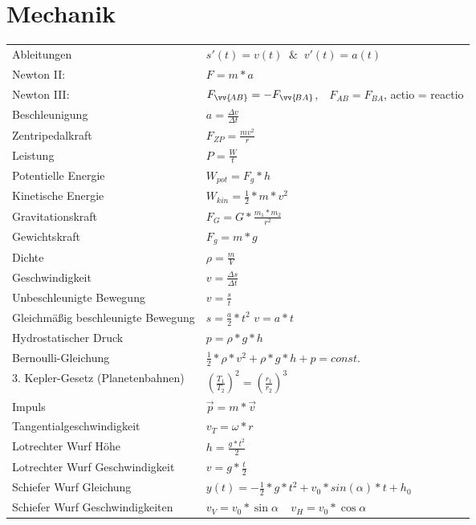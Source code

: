 \documentclass[12pt,a4paper]{paper}
\makeatletter
\newcommand{\mathleft}{\@fleqntrue\@mathmargin0pt}
\makeatother
\begin{document}
\section{Mechanik}
\mathleft
\begin{tabularx}{\textwidth}{X|X}
	Ableitungen & $s'(t) = v(t) \;\;\&\;\; v'(t) = a(t)$\\
	Newton II: & $F=m*a$\\
	Newton III: & ${F}_{\vv{\!AB}}=-{F}_{\vv{\!BA}}$,$\quad F_{AB} = F_{BA}$, actio = reactio \\
	Beschleunigung & $a=\frac{\Delta v}{\Delta t}$\\
	Zentripedalkraft & $F_{ZP}=\frac{mv^2}{r}$\\
	Leistung & $P = \frac{W}{t}$\\
	Potentielle Energie & $W_{pot} = F_g * h$\\
	Kinetische Energie & $W_{kin} = \frac{1}{2}*m*v^2$ \\
	Gravitationskraft & $F_G =G* \frac{m_1 * m_2 }{r^2}$\\
	Gewichtskraft & $F_g = m * g$\\
	Dichte & $\rho = \frac{m}{V}$\\
	Geschwindigkeit & $v = \frac{\Delta s}{\Delta t}$\\
	Unbeschleunigte Bewegung & $ v = \frac{s}{t}$\\
	Gleichmäßig beschleunigte Bewegung & $s = \frac{a}{2}*t^2$ \hspace{.5cm} $v = a * t $\\
	Hydrostatischer Druck & $p = \rho * g * h$ \\
	Bernoulli-Gleichung & $\frac{1}{2}*\rho*v^2 + \rho * g * h + p = const.$\\
	3. Kepler-Gesetz (Planetenbahnen) & $ (\frac{T_1}{T_2})^2 = (\frac{r_1}{r_2})^3$\\
	Impuls & $\vec{p} = m * \vec{v}$\\
	Tangentialgeschwindigkeit & $v_T = \omega * r$\\
	Lotrechter Wurf Höhe & $h = \frac{g* t^2}{2}$\\
	Lotrechter Wurf Geschwindigkeit & $v = g * \frac{t}{2}$\\
	Schiefer Wurf Gleichung & $y(t) = -\frac{1}{2}*g*t^2 + v_0*sin(\alpha)*t + h_0$\\
	Schiefer Wurf Geschwindigkeiten & $v_{V} = v_0 * \sin{\alpha} \:\:\:\:\: v_{H} = v_0 * \cos\alpha$\\
\end{tabularx}
\end{document}

